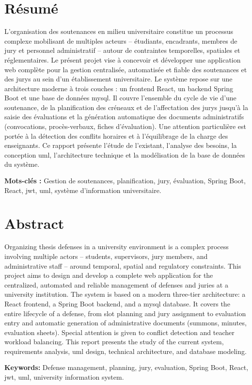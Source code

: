 \newpage
\thispagestyle{empty}
\section*{Résumé}

L'organisation des soutenances en milieu universitaire constitue un processus complexe mobilisant de multiples acteurs -- étudiants, encadrants, membres de jury et personnel administratif -- autour de contraintes temporelles, spatiales et réglementaires. Le présent projet vise à concevoir et développer une application web complète pour la gestion centralisée, automatisée et fiable des soutenances et des jurys au sein d'un établissement universitaire. Le système repose sur une architecture moderne à trois couches : un frontend React, un backend Spring Boot et une base de données \gls{mysql}. Il couvre l'ensemble du cycle de vie d'une soutenance, de la planification des créneaux et de l'affectation des jurys jusqu'à la saisie des évaluations et la génération automatique des documents administratifs (convocations, procès-verbaux, fiches d'évaluation). Une attention particulière est portée à la détection des conflits horaires et à l'équilibrage de la charge des enseignants. Ce rapport présente l'étude de l'existant, l'analyse des besoins, la conception \gls{uml}, l'architecture technique et la modélisation de la base de données du système.

\vspace{0.5cm}
\noindent\textbf{Mots-clés :} Gestion de soutenances, planification, jury, évaluation, Spring Boot, React, \gls{jwt}, \acrshort{uml}, système d'information universitaire.

\vspace{1cm}
\section*{Abstract}

Organizing thesis defenses in a university environment is a complex process involving multiple actors -- students, supervisors, jury members, and administrative staff -- around temporal, spatial and regulatory constraints. This project aims to design and develop a complete web application for the centralized, automated and reliable management of defenses and juries at a university institution. The system is based on a modern three-tier architecture: a React frontend, a Spring Boot backend, and a \acrshort{mysql} database. It covers the entire lifecycle of a defense, from slot planning and jury assignment to evaluation entry and automatic generation of administrative documents (summons, minutes, evaluation sheets). Special attention is given to conflict detection and teacher workload balancing. This report presents the study of the current system, requirements analysis, \acrshort{uml} design, technical architecture, and database modeling.

\vspace{0.5cm}
\noindent\textbf{Keywords:} Defense management, planning, jury, evaluation, Spring Boot, React, \acrshort{jwt}, \acrshort{uml}, university information system.

